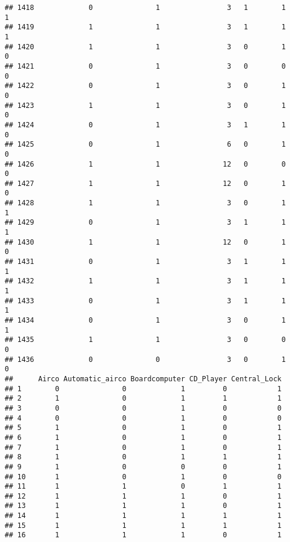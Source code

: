\documentclass[]{article}
\begin{document}
\begin{verbatim}
## 1418             0               1                3   1        1        1
## 1419             1               1                3   1        1        1
## 1420             1               1                3   0        1        0
## 1421             0               1                3   0        0        0
## 1422             0               1                3   0        1        0
## 1423             1               1                3   0        1        0
## 1424             0               1                3   1        1        0
## 1425             0               1                6   0        1        0
## 1426             1               1               12   0        0        0
## 1427             1               1               12   0        1        0
## 1428             1               1                3   0        1        1
## 1429             0               1                3   1        1        1
## 1430             1               1               12   0        1        0
## 1431             0               1                3   1        1        1
## 1432             1               1                3   1        1        1
## 1433             0               1                3   1        1        1
## 1434             0               1                3   0        1        1
## 1435             1               1                3   0        0        0
## 1436             0               0                3   0        1        0
##      Airco Automatic_airco Boardcomputer CD_Player Central_Lock
## 1        0               0             1         0            1
## 2        1               0             1         1            1
## 3        0               0             1         0            0
## 4        0               0             1         0            0
## 5        1               0             1         0            1
## 6        1               0             1         0            1
## 7        1               0             1         0            1
## 8        1               0             1         1            1
## 9        1               0             0         0            1
## 10       1               0             1         0            0
## 11       1               1             0         1            1
## 12       1               1             1         0            1
## 13       1               1             1         0            1
## 14       1               1             1         1            1
## 15       1               1             1         1            1
## 16       1               1             1         0            1

\end{verbatim}
\end{document}
